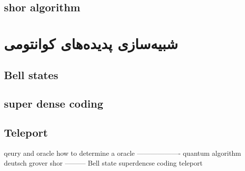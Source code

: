 \documentclass{book}
\begin{document}
\section{shor algorithm}	

\chapter{شبیه‌سازی پدیده‌های کوانتومی}
\section{Bell states}
\section{super dense coding}
\section{Teleport}
	
	
	
qeury and oracle
how to determine a oracle
-------------------
quantum algorithm
deutsch
grover
shor
---------
Bell state
superdencse coding
teleport

	
	
	
	
	
	
	
\end{document}
